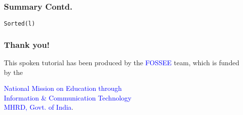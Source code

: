 \documentclass[presentation]{beamer}
\begin{document}
\begin{frame}[fragile]
\frametitle{Summary Contd.}
\label{sec-23}

\begin{verbatim}
Sorted(l)
\end{verbatim}
\end{frame}
\begin{frame}
\frametitle{Thank you!}
\label{sec-24}

  \begin{block}{}
  \begin{center}
  This spoken tutorial has been produced by the
  \textcolor{blue}{FOSSEE} team, which is funded by the 
  \end{center}
  \begin{center}
    \textcolor{blue}{National Mission on Education through \\
      Information \& Communication Technology \\ 
      MHRD, Govt. of India}.
  \end{center}  
  \end{block}
\end{frame}
\end{document}
